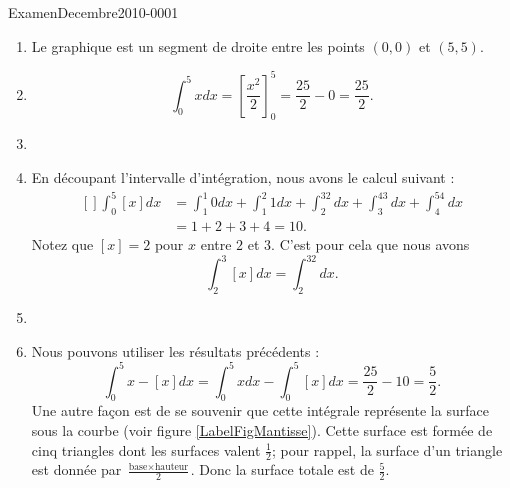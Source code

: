 
\begin{corrige}{ExamenDecembre2010-0001}

	\begin{enumerate}
		\item
			Le graphique est un segment de droite entre les points $(0,0)$ et $(5,5)$.
		\item
			\begin{equation}
				\int_0^5xdx=\left[ \frac{ x^2 }{2} \right]^5_0=\frac{ 25 }{2}-0=\frac{ 25 }{2}.
			\end{equation}
		\item
		\item
			En découpant l'intervalle d'intégration, nous avons le calcul suivant :
			\begin{equation}
				\begin{aligned}[]
					\int_0^5[x]dx&=\int_1^1 0dx+\int_1^2 1dx+\int_2^32dx+\int_3^43dx+\int_4^54dx\\
					&=1+2+3+4=10.
				\end{aligned}
			\end{equation}
			Notez que $[x]=2$ pour $x$ entre $2$ et $3$. C'est pour cela que nous avons
			\begin{equation}
				\int_2^3[x]dx=\int_2^32dx.
			\end{equation}
			
		\item
		\item
			Nous pouvons utiliser les résultats précédents :
			\begin{equation}
				\int_0^5x-[x]dx=\int_0^5xdx-\int_0^5[x]dx=\frac{ 25 }{ 2 }-10=\frac{ 5 }{2}.
			\end{equation}
			Une autre façon est de se souvenir que cette intégrale représente la surface sous la courbe (voir figure \ref{LabelFigMantisse}). Cette surface est formée de cinq triangles dont les surfaces valent $\frac{ 1 }{2}$; pour rappel, la surface d'un triangle est donnée par $\frac{ \text{base}\times\text{hauteur} }{2}$. Donc la surface totale est de $\frac{ 5 }{2}$.

	\end{enumerate}

\end{corrige}

